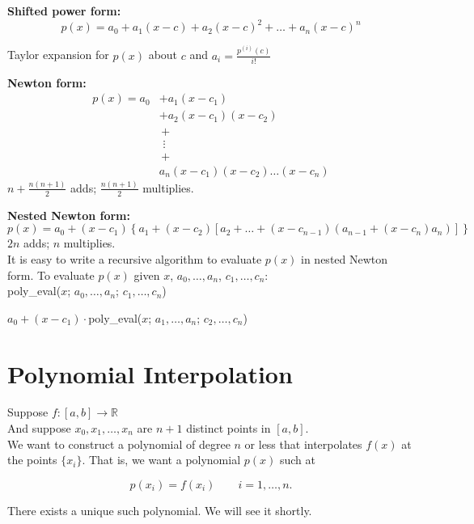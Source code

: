 \textbf{Shifted power form:}
$$
p(x) = a_0 + a_1 (x-c) + a_2 (x-c)^2 + \dots + a_n(x-c)^n
$$

Taylor expansion for $p(x)$ about $c$ and $a_i = \frac{p^{(i)}(c)}{i!}$

\textbf{Newton form:}
\begin{align}
p(x) = a_0 &+ a_1 (x-c_1) \\
           &+ a_2 (x-c_1)(x-c_2) \\
           &\,+ \\
           &\,\, \vdots \\
           &\,+ \\
           &a_n (x-c_1)(x-c_2)\dots(x-c_n)
\end{align}
$n+\frac{n(n+1)}{2}$ adds; $\frac{n(n+1)}{2}$ multiplies.

\textbf{Nested Newton form:}
$$
p(x) = a_0 + (x-c_1)\left\{a_1 + (x-c_2)\left[a_2 + \dots + (x-c_{n-1})(a_{n-1}+(x-c_n)a_n)\right]\right\}
$$
$2n$ adds; $n$ multiplies. \\

It is easy to write a recursive algorithm to evaluate $p(x)$ in nested Newton form. To evaluate $p(x)$ given $x$, $a_0, \dots, a_n$, $c_1, \dots, c_n$: \\

\quad \textsf{poly\_eval}($x$; $a_0, \dots, a_n$; $c_1, \dots, c_n$)

\qquad \qquad $a_0 + (x-c_1)\cdot $\textsf{poly\_eval}($x$; $a_1, \dots, a_n$; $c_2, \dots, c_n$)

\section{Polynomial Interpolation}

Suppose $f: [a,b] \rightarrow \mathbb{R}$ \\

And suppose $x_0, x_1, \dots , x_n$ are $n+1$ distinct points in $[a,b]$. \\

\noindent We want to construct a polynomial of degree $n$ or less that interpolates $f(x)$ at the points $\{x_i\}$. 
That is, we want a polynomial $p(x)$ such at

\begin{equation*}
    p(x_i) = f(x_i) \qquad i = 1, \dots, n.
\end{equation*}

There exists a unique such polynomial. We will see it shortly. \\


